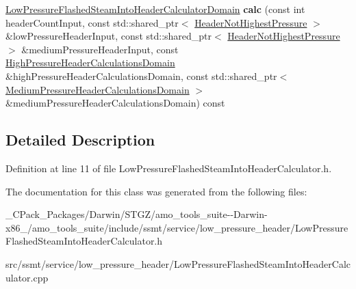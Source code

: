 \begin{DoxyCompactItemize}
\item 
\mbox{\label{class_low_pressure_flashed_steam_into_header_calculator_a0dbdfb311a3f4f49919cd2015fbd1ac8}} 
\hyperlink{class_low_pressure_flashed_steam_into_header_calculator_domain}{Low\+Pressure\+Flashed\+Steam\+Into\+Header\+Calculator\+Domain} {\bfseries calc} (const int header\+Count\+Input, const std\+::shared\+\_\+ptr$<$ \hyperlink{class_header_not_highest_pressure}{Header\+Not\+Highest\+Pressure} $>$ \&low\+Pressure\+Header\+Input, const std\+::shared\+\_\+ptr$<$ \hyperlink{class_header_not_highest_pressure}{Header\+Not\+Highest\+Pressure} $>$ \&medium\+Pressure\+Header\+Input, const \hyperlink{class_high_pressure_header_calculations_domain}{High\+Pressure\+Header\+Calculations\+Domain} \&high\+Pressure\+Header\+Calculations\+Domain, const std\+::shared\+\_\+ptr$<$ \hyperlink{class_medium_pressure_header_calculations_domain}{Medium\+Pressure\+Header\+Calculations\+Domain} $>$ \&medium\+Pressure\+Header\+Calculations\+Domain) const
\end{DoxyCompactItemize}


\subsection{Detailed Description}


Definition at line 11 of file Low\+Pressure\+Flashed\+Steam\+Into\+Header\+Calculator.\+h.



The documentation for this class was generated from the following files\+:\begin{DoxyCompactItemize}
\item 
\+\_\+\+C\+Pack\+\_\+\+Packages/\+Darwin/\+S\+T\+G\+Z/amo\+\_\+tools\+\_\+suite-\/-\/\+Darwin-\/x86\+\_/amo\+\_\+tools\+\_\+suite/include/ssmt/service/low\+\_\+pressure\+\_\+header/Low\+Pressure\+Flashed\+Steam\+Into\+Header\+Calculator.\+h\item 
src/ssmt/service/low\+\_\+pressure\+\_\+header/Low\+Pressure\+Flashed\+Steam\+Into\+Header\+Calculator.\+cpp\end{DoxyCompactItemize}

